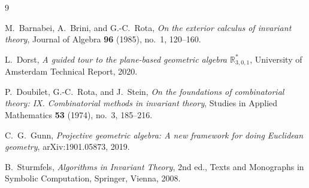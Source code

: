 \documentclass[11pt]{article}
\theoremstyle{definition}
\begin{document}
\begin{thebibliography}{9}

M.~Barnabei, A.~Brini, and G.-C.~Rota,
\emph{On the exterior calculus of invariant theory},
Journal of Algebra \textbf{96} (1985), no.~1, 120--160.

L.~Dorst,
\emph{A guided tour to the plane-based geometric algebra $\mathbb{R}^*_{3,0,1}$},
University of Amsterdam Technical Report, 2020.

P.~Doubilet, G.-C.~Rota, and J.~Stein,
\emph{On the foundations of combinatorial theory: IX. Combinatorial methods in invariant theory},
Studies in Applied Mathematics \textbf{53} (1974), no.~3, 185--216.

C.~G.~Gunn,
\emph{Projective geometric algebra: A new framework for doing Euclidean geometry},
arXiv:1901.05873, 2019.

B.~Sturmfels,
\emph{Algorithms in Invariant Theory},
2nd ed., Texts and Monographs in Symbolic Computation, Springer, Vienna, 2008.

\end{thebibliography}
\end{document}
